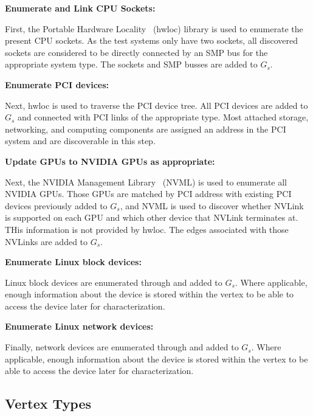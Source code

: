 \textbf{Enumerate and Link CPU Sockets:}

First, the Portable Hardware Locality~\cite{broquedis2010hwloc} (hwloc) library is used to enumerate the present CPU sockets.
As the test systems only have two sockets, all discovered sockets are considered to be directly connected by an SMP bus for the appropriate system type.
The sockets and SMP busses are added to $G_s$.

\textbf{Enumerate PCI devices:}

Next, hwloc is used to traverse the PCI device tree.
All PCI devices are added to $G_s$ and connected with PCI links of the appropriate type.
Most attached storage, networking, and computing components are assigned an address in the PCI system and are discoverable in this step.


\textbf{Update GPUs to NVIDIA GPUs as appropriate:}

Next, the NVIDIA Management Library~\cite{nvidia2017nvml} (NVML) is used to enumerate all NVIDIA GPUs.
Those GPUs are matched by PCI address with existing PCI devices previously added to $G_s$, and NVML is used to discover whether NVLink is supported on each GPU and which other device that NVLink terminates at.
THis information is not provided by hwloc.
The edges associated with those NVLinks are added to $G_s$.


\textbf{Enumerate Linux block devices:}

Linux block devices are enumerated through  and added to $G_s$.
Where applicable, enough information about the device is stored within the vertex to be able to access the device later for characterization.

\textbf{Enumerate Linux network devices:}

Finally, network devices are enumerated through  and added to $G_s$.
Where applicable, enough information about the device is stored within the vertex to be able to access the device later for characterization.

\subsection{Vertex Types}
\label{sec:system-vertices}

